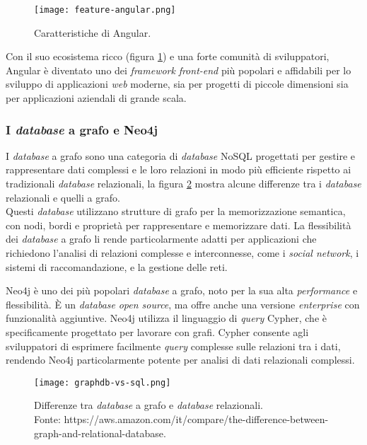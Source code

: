 \begin{figure}[h] 
  \centering 
  \texttt{[image: feature-angular.png]} 
  \caption{Caratteristiche di Angular.}
  \label{fig:feature-angular}
\end{figure}

Con il suo ecosistema ricco (figura \ref*{fig:feature-angular}) e una forte comunità di sviluppatori, Angular è diventato uno dei \textit{framework} \textit{front-end} più popolari e 
affidabili per lo sviluppo di applicazioni \textit{web} moderne, sia per progetti di piccole dimensioni sia per applicazioni aziendali di grande scala.

\subsubsection*{I \textit{database} a grafo e Neo4j}

I \textit{database} a grafo sono una categoria di \textit{database} NoSQL progettati per gestire e rappresentare dati complessi e le loro relazioni 
in modo più efficiente rispetto ai tradizionali \textit{database} relazionali, la figura \ref*{fig:graphdb-vs-sql} mostra alcune differenze tra i \textit{database} relazionali e quelli a grafo.\\
Questi \textit{database} utilizzano strutture di grafo per la memorizzazione 
semantica, con nodi, bordi e proprietà per rappresentare e memorizzare dati. La flessibilità dei \textit{database} a grafo li rende particolarmente 
adatti per applicazioni che richiedono l'analisi di relazioni complesse e interconnesse, come i \textit{social network}, i sistemi di raccomandazione, 
e la gestione delle reti.

Neo4j è uno dei più popolari \textit{database} a grafo, noto per la sua alta \textit{performance} e flessibilità. È un \textit{database} 
\textit{open source}, ma offre anche una versione \textit{enterprise} con funzionalità aggiuntive. Neo4j utilizza il linguaggio di 
\textit{query} Cypher, che è specificamente progettato per lavorare con grafi. Cypher consente agli sviluppatori di esprimere 
facilmente \textit{query} complesse sulle relazioni tra i dati, rendendo Neo4j particolarmente potente per analisi di dati relazionali complessi.

\begin{figure}[h] 
  \centering 
  \texttt{[image: graphdb-vs-sql.png]} 
  \caption{Differenze tra \textit{database} a grafo e \textit{database} relazionali. \\Fonte: https://aws.amazon.com/it/compare/the-difference-between-graph-and-relational-database.}
  \label{fig:graphdb-vs-sql}
\end{figure}


